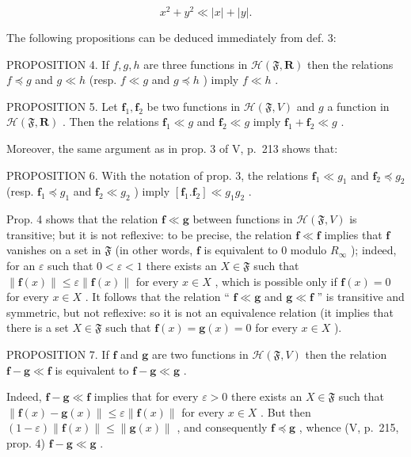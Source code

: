 \[
x ^ {2} + y ^ {2} \ll | x | + | y |.
\]

The following propositions can be deduced immediately from def. 3:

PROPOSITION 4. If \(f, g, h\) are three functions in \(\mathcal{H}(\mathfrak{F}, \mathbf{R})\) then the relations \(f \preccurlyeq g\) and \(g \ll h\) (resp. \(f \ll g\) and \(g \preccurlyeq h\) ) imply \(f \ll h\) .

PROPOSITION 5. Let \(\mathbf{f}_1, \mathbf{f}_2\) be two functions in \(\mathcal{H}(\mathfrak{F}, V)\) and \(g\) a function in \(\mathcal{H}(\mathfrak{F}, \mathbf{R})\) . Then the relations \(\mathbf{f}_1 \ll g\) and \(\mathbf{f}_2 \ll g\) imply \(\mathbf{f}_1 + \mathbf{f}_2 \ll g\) .

Moreover, the same argument as in prop. 3 of V, p.~213 shows that:

PROPOSITION 6. With the notation of prop. 3, the relations \(\mathbf{f}_1 \ll g_1\) and \(\mathbf{f}_2 \preccurlyeq g_2\) (resp. \(\mathbf{f}_1 \preccurlyeq g_1\) and \(\mathbf{f}_2 \ll g_2\) ) imply \([\mathbf{f}_1.\mathbf{f}_2] \ll g_1g_2\) .

Prop. 4 shows that the relation \(\mathbf{f} \ll \mathbf{g}\) between functions in \(\mathcal{H}(\mathfrak{F}, V)\) is transitive; but it is not reflexive: to be precise, the relation \(\mathbf{f} \ll \mathbf{f}\) implies that \(\mathbf{f}\) vanishes on a set in \(\mathfrak{F}\) (in other words, \(\mathbf{f}\) is equivalent to 0 modulo \(R_{\infty}\) ); indeed, for an \(\varepsilon\) such that \(0 < \varepsilon < 1\) there exists an \(X \in \mathfrak{F}\) such that \(\| \mathbf{f}(x) \| \leqslant \varepsilon \| \mathbf{f}(x) \|\) for every \(x \in X\) , which is possible only if \(\mathbf{f}(x) = 0\) for every \(x \in X\) . It follows that the relation `` \(\mathbf{f} \ll \mathbf{g}\) and \(\mathbf{g} \ll \mathbf{f}\) '' is transitive and symmetric, but not reflexive: so it is not an equivalence relation (it implies that there is a set \(X \in \mathfrak{F}\) such that \(\mathbf{f}(x) = \mathbf{g}(x) = 0\) for every \(x \in X\) ).

PROPOSITION 7. If \(\mathbf{f}\) and \(\mathbf{g}\) are two functions in \(\mathcal{H}(\mathfrak{F}, V)\) then the relation \(\mathbf{f} - \mathbf{g} \ll \mathbf{f}\) is equivalent to \(\mathbf{f} - \mathbf{g} \ll \mathbf{g}\) .

Indeed, \(\mathbf{f} - \mathbf{g} \ll \mathbf{f}\) implies that for every \(\varepsilon > 0\) there exists an \(X \in \mathfrak{F}\) such that \(\| \mathbf{f}(x) - \mathbf{g}(x) \| \leqslant \varepsilon \| \mathbf{f}(x) \|\) for every \(x \in X\) . But then \((1 - \varepsilon) \| \mathbf{f}(x) \| \leqslant \| \mathbf{g}(x) \|\) , and consequently \(\mathbf{f} \preccurlyeq \mathbf{g}\) , whence (V, p.~215, prop. 4) \(\mathbf{f} - \mathbf{g} \ll \mathbf{g}\) .

